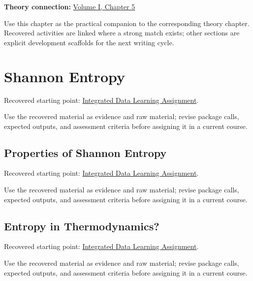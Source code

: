 \documentclass[
  letterpaper,
]{scrbook}
\begin{document}

\textbf{Theory connection:} \hyperref[ch-information]{Volume I, Chapter
5}

Use this chapter as the practical companion to the corresponding theory
chapter. Recovered activities are linked where a strong match exists;
other sections are explicit development scaffolds for the next writing
cycle.

\section*{Shannon Entropy}\label{sec-pr-05-shannon-entropy}


Recovered starting point:
\hyperref[sec-lab-integrated-learning-assignment]{Integrated Data
Learning Assignment}.

Use the recovered material as evidence and raw material; revise package
calls, expected outputs, and assessment criteria before assigning it in
a current course.

\subsection*{Properties of Shannon
Entropy}\label{sec-pr-05-properties-of-shannon-entropy}

Recovered starting point:
\hyperref[sec-lab-integrated-learning-assignment]{Integrated Data
Learning Assignment}.

Use the recovered material as evidence and raw material; revise package
calls, expected outputs, and assessment criteria before assigning it in
a current course.

\subsection*{Entropy in
Thermodynamics?}\label{sec-pr-05-entropy-in-thermodynamics}

Recovered starting point:
\hyperref[sec-lab-integrated-learning-assignment]{Integrated Data
Learning Assignment}.

Use the recovered material as evidence and raw material; revise package
calls, expected outputs, and assessment criteria before assigning it in
a current course.
\end{document}
